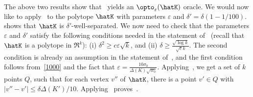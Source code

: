 The above two results show that~ yields an  $\opto_\varepsilon(\hatK)$ oracle.  We would now like to apply~ to the polytope $\hatK$ with parameters $\varepsilon$ and $\delta' = \delta(1-1/100).$~ shows that $\hatK$ is $\delta'$-well-separated. We now need to check that the parameters $\varepsilon$ and $\delta'$ satisfy the following conditions needed in the statement of~ (recall that $\hatK$ is a polytope in $\Re^k$): (i)  $\delta^2 \geq c \varepsilon \sqrt{k}$, and (ii) $\delta \geq \frac{\sqrt{\log k}}{\sqrt{c} k}.$
The second condition is already an assumption in the statement of~, and the first condition follows from~\eqref{1000} and the fact that $\varepsilon = \frac{10 \sigma_0}{\Delta(K) \sqrt{w_0}}$. Applying~, we get a set of $k$ points $Q$, such that for each vertex $v'' $ of $\hatK$, there is a point $v' \in Q$ with $|v''-v'| \leq \delta \Delta(K')/10$. Applying~ proves~. 

